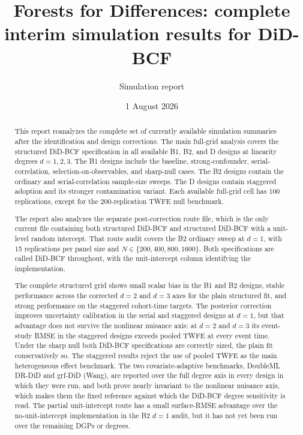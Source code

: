 \documentclass[11pt]{article}
\title{\textbf{Forests for Differences}: complete interim simulation results for DiD-BCF}
\author{Simulation report}
\date{1 August 2026}
\begin{document}
\maketitle

\begin{abstract}
This report reanalyzes the complete set of currently available simulation
summaries after the identification and design corrections. The main full-grid
analysis covers the structured DiD-BCF specification in all available B1, B2,
and D designs at linearity degrees $d=1,2,3$. The B1 designs include the
baseline, strong-confounder, serial-correlation, selection-on-observables, and
sharp-null cases. The B2 designs contain the ordinary and serial-correlation
sample-size sweeps. The D designs contain staggered adoption and its stronger
contamination variant. Each available full-grid cell has 100 replications,
except for the 200-replication TWFE null benchmark.

The report also analyzes the separate post-correction route file, which is the
only current file containing both structured DiD-BCF and structured DiD-BCF with
a unit-level random intercept. That route audit covers the B2 ordinary sweep
at $d=1$, with 15 replications per panel size and $N\in\{200,400,800,1600\}$.
Both specifications are called DiD-BCF throughout, with the unit-intercept
column identifying the implementation.

The complete structured grid shows small scalar bias in the B1 and B2 designs,
stable performance across the corrected $d=2$ and $d=3$ axes for the plain
structured fit, and strong performance on the staggered cohort-time targets.
The posterior correction improves uncertainty calibration in the serial and
staggered designs at $d=1$, but that advantage does not survive the nonlinear
nuisance axis: at $d=2$ and $d=3$ its event-study RMSE in the staggered designs
exceeds pooled TWFE at every event time. Under the sharp null both DiD-BCF
specifications are correctly sized, the plain fit conservatively so. The
staggered results reject the use of pooled TWFE as the main heterogeneous
effect benchmark. The two covariate-adaptive benchmarks, DoubleML DR-DiD and
grf-DiD (Wang), are reported over the full degree axis in every design in which
they were run, and both prove nearly invariant to the nonlinear nuisance axis,
which makes them the fixed reference against which the DiD-BCF degree
sensitivity is read. The partial unit-intercept route has a small surface-RMSE
advantage over the no-unit-intercept implementation in the B2 $d=1$ audit,
but it has not yet been run over the remaining DGPs or degrees.
\end{abstract}
\end{document}
